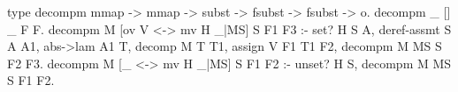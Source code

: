   type decompm mmap -> mmap -> subst -> fsubst -> fsubst -> o.
  decompm _ [] _ F F.
  decompm M [ov V <-> mv H _|MS] S F1 F3 :- set? H S A,
    deref-assmt S A A1,
    abs->lam A1 T, decomp M T T1, 
    assign V F1 T1 F2,
    decompm M MS S F2 F3. 
  decompm M [_ <-> mv H _|MS] S F1 F2 :- unset? H S,
    decompm M MS S F1 F2.
